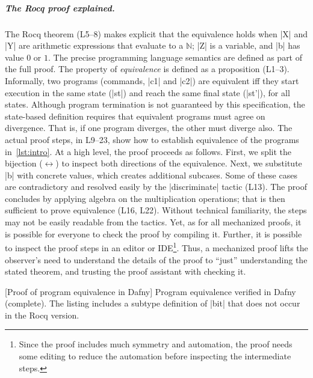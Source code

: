 \subparagraph*{The Rocq proof explained.}
The Rocq theorem (L5--8) makes explicit that the equivalence holds when
\pr|X| and \pr|Y| are arithmetic expressions that evaluate to a \(\mathbb{N}\); \pr|Z| is a variable, and \pr|b| has value \(0\) or \(1\).
The precise programming language semantics are defined as part of the full proof.
The property of \emph{equivalence} is defined as a proposition (L1--3).
Informally, two programs (commands, \pr|c1| and \pr|c2|) are equivalent
iff they start execution in the same state (\pr|st|) and reach the same final state (\pr|st'|), for all states.
Although program termination is not guaranteed by this specification,
the state-based definition requires that equivalent programs must agree on divergence.
That is, if one program diverges, the other must diverge also.
The actual proof steps, in L9--23, show how to establish equivalence of the programs in~\autoref{lst:intro}.
At a high level, the proof proceeds as follows.
First, we split the bijection (\( \leftrightarrow \)) to inspect both directions of the equivalence.
Next, we substitute \pr|b| with concrete values, which creates additional subcases.
Some of these cases are contradictory and resolved easily by the \pr|discriminate| tactic (L13).
The proof concludes by applying algebra on the multiplication operations;
that is then sufficient to prove equivalence (L16, L22).
Without technical familiarity, the steps may not be easily readable from the tactics.
Yet, as for all mechanized proofs, it is possible for everyone to check the proof by compiling it.
Further, it is possible to inspect the proof steps in an editor or IDE\footnote{
Since the proof includes much symmetry and automation,
the proof needs some editing to reduce the automation before inspecting the intermediate steps.}.
Thus, a mechanized proof lifts the observer's need to understand the details of the proof to \enquote{just} understanding the stated theorem, and trusting the proof assistant with checking it.

\begin{center}
\begin{minipage}{\textwidth}
\captionsetup{type=lstlisting}
[Proof of program equivalence in Dafny]{
Program equivalence verified in Dafny (complete).
The listing includes a subtype definition of \pr|bit| that does not occur in the Rocq version.}
\label{lst:eq-dafny}
\end{minipage}
\end{center}

